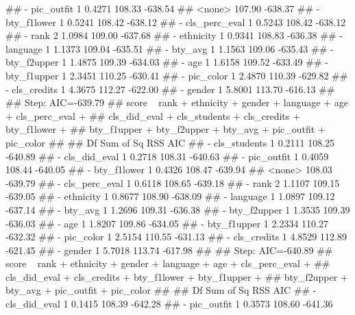 \documentclass[]{article}
\newenvironment{Shaded}{\begin{snugshade}}{\end{snugshade}}
\newcommand{\NormalTok}[1]{#1}
\begin{document}
\begin{Shaded}
\begin{Highlighting}[]
\NormalTok{## - pic_outfit     1    0.4271 108.33 -638.54}
\NormalTok{## <none>                       107.90 -638.37}
\NormalTok{## - bty_f1lower    1    0.5241 108.42 -638.12}
\NormalTok{## - cls_perc_eval  1    0.5243 108.42 -638.12}
\NormalTok{## - rank           2    1.0984 109.00 -637.68}
\NormalTok{## - ethnicity      1    0.9341 108.83 -636.38}
\NormalTok{## - language       1    1.1373 109.04 -635.51}
\NormalTok{## - bty_avg        1    1.1563 109.06 -635.43}
\NormalTok{## - bty_f2upper    1    1.4875 109.39 -634.03}
\NormalTok{## - age            1    1.6158 109.52 -633.49}
\NormalTok{## - bty_f1upper    1    2.3451 110.25 -630.41}
\NormalTok{## - pic_color      1    2.4870 110.39 -629.82}
\NormalTok{## - cls_credits    1    4.3675 112.27 -622.00}
\NormalTok{## - gender         1    5.8001 113.70 -616.13}
\NormalTok{## }
\NormalTok{## Step:  AIC=-639.79}
\NormalTok{## score ~ rank + ethnicity + gender + language + age + cls_perc_eval + }
\NormalTok{##     cls_did_eval + cls_students + cls_credits + bty_f1lower + }
\NormalTok{##     bty_f1upper + bty_f2upper + bty_avg + pic_outfit + pic_color}
\NormalTok{## }
\NormalTok{##                 Df Sum of Sq    RSS     AIC}
\NormalTok{## - cls_students   1    0.2111 108.25 -640.89}
\NormalTok{## - cls_did_eval   1    0.2718 108.31 -640.63}
\NormalTok{## - pic_outfit     1    0.4059 108.44 -640.05}
\NormalTok{## - bty_f1lower    1    0.4326 108.47 -639.94}
\NormalTok{## <none>                       108.03 -639.79}
\NormalTok{## - cls_perc_eval  1    0.6118 108.65 -639.18}
\NormalTok{## - rank           2    1.1107 109.15 -639.05}
\NormalTok{## - ethnicity      1    0.8677 108.90 -638.09}
\NormalTok{## - language       1    1.0897 109.12 -637.14}
\NormalTok{## - bty_avg        1    1.2696 109.31 -636.38}
\NormalTok{## - bty_f2upper    1    1.3535 109.39 -636.03}
\NormalTok{## - age            1    1.8207 109.86 -634.05}
\NormalTok{## - bty_f1upper    1    2.2334 110.27 -632.32}
\NormalTok{## - pic_color      1    2.5154 110.55 -631.13}
\NormalTok{## - cls_credits    1    4.8529 112.89 -621.45}
\NormalTok{## - gender         1    5.7018 113.74 -617.98}
\NormalTok{## }
\NormalTok{## Step:  AIC=-640.89}
\NormalTok{## score ~ rank + ethnicity + gender + language + age + cls_perc_eval + }
\NormalTok{##     cls_did_eval + cls_credits + bty_f1lower + bty_f1upper + }
\NormalTok{##     bty_f2upper + bty_avg + pic_outfit + pic_color}
\NormalTok{## }
\NormalTok{##                 Df Sum of Sq    RSS     AIC}
\NormalTok{## - cls_did_eval   1    0.1415 108.39 -642.28}
\NormalTok{## - pic_outfit     1    0.3573 108.60 -641.36}

\end{Highlighting}
\end{Shaded}
\end{document}
